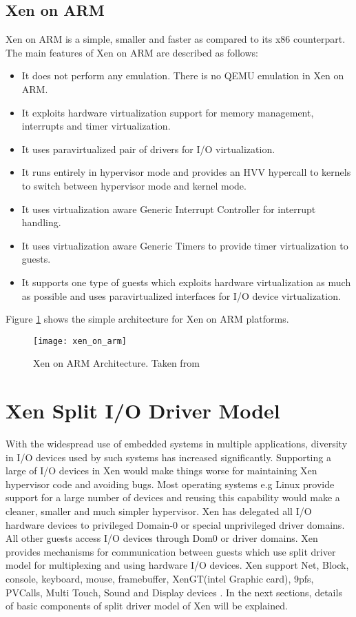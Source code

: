 \subsection{Xen on ARM\label{sec:xendevice}}
Xen on ARM is a simple, smaller and faster as compared to its x86 counterpart. The main features of Xen on ARM are described as follows:
\begin{itemize}
	\item It does not perform any emulation. There is no QEMU emulation in Xen on ARM.
	\item It exploits hardware virtualization support for memory management, interrupts and timer virtualization.
	\item It uses paravirtualized pair of drivers for I/O virtualization.
	\item It runs entirely in hypervisor mode and provides an HVV hypercall to kernels to switch between hypervisor mode and kernel mode.
	\item It uses virtualization aware Generic Interrupt Controller for interrupt handling.
	\item It uses virtualization aware Generic Timers to provide timer virtualization to guests.
	\item It supports one type of guests which exploits hardware virtualization as much as possible and uses paravirtualized interfaces for I/O device virtualization.
\end{itemize}

Figure \ref{xen_on_arm} shows the simple architecture for Xen on ARM platforms.
\begin{figure}[!htbp]
	\centering
	\texttt{[image: xen\_on\_arm]}
	\caption{Xen on ARM Architecture. Taken from  \cite{xen_arm}}
	\label{xen_on_arm}
\end{figure}

\section{Xen Split I/O Driver Model\label{sec:xensplit}}
With the widespread use of embedded systems in multiple applications, diversity in I/O devices used by such systems has increased significantly. Supporting a large of I/O devices in Xen would make things worse for maintaining Xen hypervisor code and avoiding bugs. Most operating systems e.g Linux provide support for a large number of devices and reusing this capability would make a cleaner, smaller and much simpler hypervisor. Xen has delegated all I/O hardware devices to privileged Domain-0 or special unprivileged driver domains. All other guests access I/O devices through Dom0 or driver domains. Xen provides mechanisms for communication between guests which use split driver model for multiplexing and using hardware I/O devices. Xen support Net, Block, console, keyboard, mouse, framebuffer, XenGT(intel Graphic
card), 9pfs, PVCalls, Multi Touch, Sound and Display devices \cite{xen_release}. In the next sections, details of basic components of split driver model of Xen will be explained.

